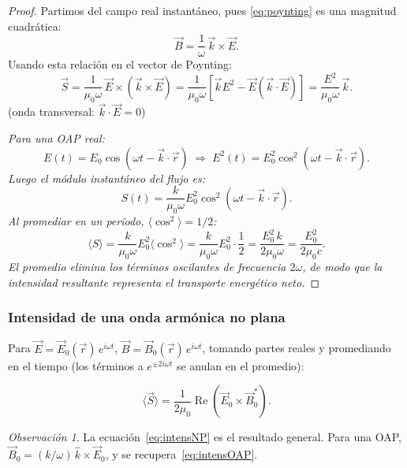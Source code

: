 \documentclass[12pt, a4paper]{article}
\theoremstyle{plain}
\theoremstyle{definition}
\theoremstyle{remark}
\newtheorem*{observacion}{Observación}
\newcommand{\ve}[1]{\vec{#1}}
\newcommand{\uvec}[1]{\hat{#1}}
\begin{document}
\begin{proof}
Partimos del campo real instantáneo, pues
\eqref{eq:poynting} es una magnitud cuadrática:
\[
  \ve{B}=\frac{1}{\omega}\,\ve{k}\times\ve{E}.
\]
Usando esta relación en el vector de Poynting:
\[
  \ve{S} = \frac{1}{\mu_0\omega}\,\ve{E}\times(\ve{k}\times\ve{E})
         = \frac{1}{\mu_0\omega}\!\left[
             \ve{k}E^2 - \ve{E}(\ve{k}\cdot\ve{E})
           \right]
         = \frac{E^2}{\mu_0\omega}\,\ve{k}.
\]
\noindent\normalfont\footnotesize(onda transversal: $\ve{k}\cdot\ve{E}=0$)\par\small\itshape
Para una OAP real:
\[
  E(t)=E_0\cos(\omega t-\ve{k}\cdot\ve{r})
  \;\Rightarrow\;
  E^2(t)=E_0^2\cos^2(\omega t-\ve{k}\cdot\ve{r}).
\]
Luego el módulo instantáneo del flujo es:
\[
  S(t)=\frac{k}{\mu_0\omega}E_0^2\cos^2(\omega t-\ve{k}\cdot\ve{r}).
\]
Al promediar en un período, $\langle\cos^2\rangle=1/2$:
\[
  \langle S\rangle = \frac{k}{\mu_0\omega}E_0^2\langle\cos^2\rangle
  = \frac{k}{\mu_0\omega}E_0^2\cdot\frac{1}{2}
  = \frac{E_0^2\,k}{2\mu_0\omega}
  = \frac{E_0^2}{2\mu_0 c}.
\]
\noindent El promedio elimina los términos oscilantes de frecuencia $2\omega$,
de modo que la intensidad resultante representa el transporte energético neto.
\end{proof}

\subsubsection{Intensidad de una onda armónica no plana}

Para $\ve{E}=\ve{E}_0(\ve{r})\,e^{i\omega t}$, $\ve{B}=\ve{B}_0(\ve{r})\,e^{i\omega t}$,
tomando partes reales y promediando en el tiempo (los términos a $e^{\pm 2i\omega t}$
se anulan en el promedio):

\begin{mdframed}[style=resultado]
\begin{equation}
  \langle\ve{S}\rangle
  = \frac{1}{2\mu_0}\operatorname{Re}\!\left(\ve{E}_0\times\ve{B}_0^*\right).
  \label{eq:intensNP}
\end{equation}
\end{mdframed}

\begin{observacion}
La ecuación~\eqref{eq:intensNP} es el resultado general. Para una OAP,
$\ve{B}_0=(k/\omega)\,\uvec{k}\times\ve{E}_0$, y se recupera~\eqref{eq:intensOAP}.
\end{observacion}

\end{document}
